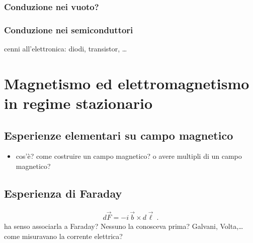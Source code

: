 \documentclass[letterpaper,10pt,italian]{jupyterBook}
\begin{document}
\subsubsection{Conduzione nei vuoto?}
\label{\detokenize{ch/electromagnetism/electric-current:conduzione-nei-vuoto}}

\subsubsection{Conduzione nei semiconduttori}
\label{\detokenize{ch/electromagnetism/electric-current:conduzione-nei-semiconduttori}}
\sphinxAtStartPar
cenni all’elettronica: diodi, transistor, …

\sphinxstepscope


\section{Magnetismo ed elettromagnetismo in regime stazionario}
\label{\detokenize{ch/electromagnetism/electromagnetism-steady:magnetismo-ed-elettromagnetismo-in-regime-stazionario}}\label{\detokenize{ch/electromagnetism/electromagnetism-steady:physics-hs-electromagnetism-electromagnetism-steady}}\label{\detokenize{ch/electromagnetism/electromagnetism-steady::doc}}

\subsection{Esperienze elementari su campo magnetico}
\label{\detokenize{ch/electromagnetism/electromagnetism-steady:esperienze-elementari-su-campo-magnetico}}\begin{itemize}
\item {} 
\sphinxAtStartPar
cos’è? come costruire un campo magnetico? o avere multipli di un campo magnetico?

\end{itemize}


\subsection{Esperienza di Faraday}
\label{\detokenize{ch/electromagnetism/electromagnetism-steady:esperienza-di-faraday}}\begin{equation*}
\begin{split}d \vec{F} = - i \, \vec{b} \times d \vec{\ell} \ .\end{split}
\end{equation*}
\sphinxAtStartPar
{} ha senso associarla a Faraday? Nessuno la conosceva prima? Galvani, Volta,… come misuravano la corrente elettrica?
\end{document}
